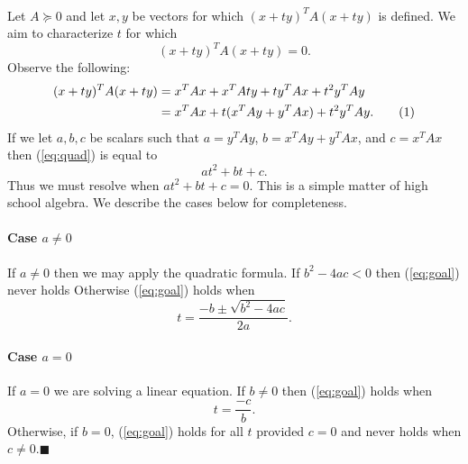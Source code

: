 \documentclass[letterpaper,12pt,oneside,onecolumn]{article}
\newcommand\numberthis{\addtocounter{equation}{1}\tag{\theequation}}
\begin{document}
\paragraph{}
Let $A \succcurlyeq 0$ and let $x,y$ be vectors for which $(x+ty)^TA(x+ty)$ is defined. We aim to characterize $t$ for which
\begin{equation}(x+ty)^TA(x+ty) = 0\label{eq:goal}.\end{equation} Observe the following:
\begin{align*}
(x+ty)^TA(x+ty) &= x^TAx + x^TAty + ty^TAx + t^2y^TAy \\
&= x^TAx + t(x^TAy + y^TAx) + t^2y^TAy. \numberthis \label{eq:quad}
\end{align*}
If we let $a,b,c$ be scalars such that $a = y^TAy$, $b=x^TAy + y^TAx$, and $c = x^TAx$ then (\ref{eq:quad}) is equal to
$$at^2 + bt + c.$$
Thus we must resolve when $at^2 + bt +c =0$. This is a simple matter of high school algebra. We describe the cases below for completeness.
\paragraph{Case $a \neq 0$}
If $a \neq 0$ then we may apply the quadratic formula. If $b^2-4ac <0$ then (\ref{eq:goal}) never holds Otherwise (\ref{eq:goal}) holds when
$$t = \frac{-b \pm \sqrt{b^2-4ac}}{2a}.$$
\paragraph{Case $a = 0$}
If $a = 0$ we are solving a linear equation. If $b \neq 0$ then (\ref{eq:goal}) holds when $$t = \frac{-c}{b}.$$ Otherwise, if $b = 0$, (\ref{eq:goal}) holds for all $t$ provided $c=0$ and never holds when $c\neq 0$.$\blacksquare$
\end{document}
